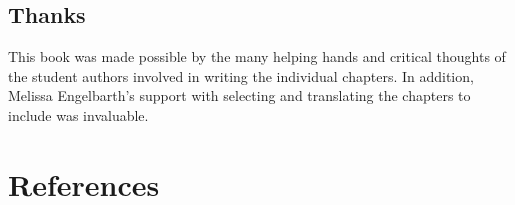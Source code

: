 \documentclass[
  letterpaper,
]{book}
\begin{document}
\section*{Thanks}\label{thanks}


This book was made possible by the many helping hands and critical
thoughts of the student authors involved in writing the individual
chapters. In addition, Melissa Engelbarth's support with selecting and
translating the chapters to include was invaluable.


\chapter*{References}\label{references}

\end{document}
